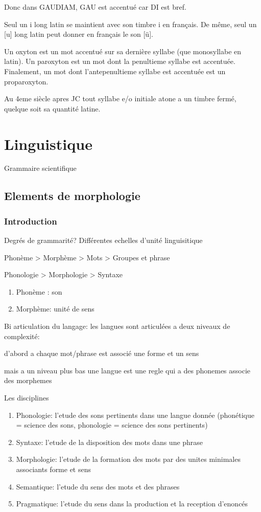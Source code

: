 \documentclass[a4paper]{report}
\theoremstyle{definition}
\theoremstyle{remark}
\begin{document}
Donc dans GAUDIAM, GAU est accentué car DI est bref. \par

Seul un i long latin se maintient avec son timbre i en français. De même, seul un [u] long latin peut donner en français le son [ü]. \par 

Un oxyton est un mot accentué sur sa dernière syllabe (que monosyllabe en latin). Un paroxyton est un mot dont la penultieme syllabe est accentuée. Finalement, un mot dont l'antepenultieme syllabe est accentuée est un proparoxyton. 

Au 4eme siècle apres JC tout syllabe e/o initiale atone a un timbre fermé, quelque soit sa quantité latine.

\chapter{Linguistique}

Grammaire scientifique

\section{Elements de morphologie}

\subsection{Introduction}

Degrés de grammarité? Différentes echelles d'unité linguisitique \par

Phonème > Morphème > Mots > Groupes et phrase \par
Phonologie > Morphologie > Syntaxe
\begin{enumerate}
    \item Phonème : son
    \item Morphème: unité de sens 
\end{enumerate}

Bi articulation du langage: les langues sont articulées a deux niveaux de complexité:\par
d'abord a chaque mot/phrase est associé une forme et un sens\par
mais a un niveau plus bas une langue est une regle qui a des phonemes associe des morphemes 

Les disciplines 
\begin{enumerate}
    \item Phonologie: l'etude des sons pertinents dans une langue donnée (phonétique = science des sons, phonologie = science des sons pertinents)
    \item Syntaxe: l'etude de la disposition des mots dans une phrase
    \item Morphologie: l'etude de la formation des mots par des unites minimales associants forme et sens
    \item Semantique: l'etude du sens des mots et des phrases
    \item Pragmatique: l'etude du sens dans la production et la reception d'enoncés
\end{enumerate}
\end{document}

